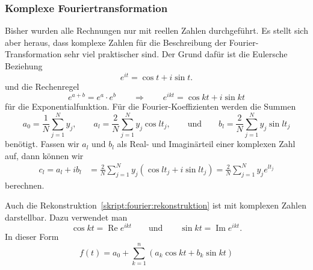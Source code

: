 %
%
%
\subsubsection{Komplexe Fouriertransformation}
Bisher wurden alle Rechnungen nur mit reellen Zahlen durchgeführt.
Es stellt sich aber heraus, dass komplexe Zahlen für die Beschreibung
der Fourier-Transformation sehr viel praktischer sind.
Der Grund dafür ist die Eulersche Beziehung
\[
e^{it} = \cos t + i \sin t.
\]
und die Rechenregel
\[
e^{a+b}=e^a\cdot e^b
\qquad\Rightarrow\qquad
e^{ikt}=\cos kt+i\sin kt
\]
für die Exponentialfunktion.
Für die Fourier-Koeffizienten werden die Summen
\[
a_0
=
\frac{1}{N}\sum_{j=1}^N y_j,\qquad
a_l
=
\frac{2}{N}\sum_{j=1}^N y_j \cos lt_j,
\qquad\text{und}\qquad
b_l
=
\frac{2}{N}\sum_{j=1}^N y_j \sin lt_j
\]
benötigt.
Fassen wir $a_l$ und $b_l$ als Real- und Imaginärteil einer komplexen
Zahl auf, dann können wir 
\begin{align*}
c_l
=
a_l+ib_l
&=
\frac2{N} \sum_{j=1}^N y_j (\cos lt_j + i \sin lt_j)
=
\frac2{N} \sum_{j=1}^N y_j e^{lt_j}
\end{align*}
berechnen.

Auch die Rekonstruktion~\eqref{skript:fourier:rekonstruktion} ist
mit komplexen Zahlen darstellbar.
Dazu verwendet man 
\[
\cos kt = \operatorname{Re} e^{ikt}
\qquad\text{und}\qquad
\sin kt = \operatorname{Im} e^{ikt}.
\]
In dieser Form
\[
f(t)
=
a_0
+\sum_{k=1}^n (a_k \cos kt + b_k \sin kt)
\]




